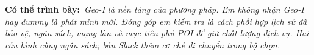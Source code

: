 \documentclass[10pt,a4paper]{article}
\newcommand{\say}[1]{\par\textbf{Có thể trình bày:}\ \textit{#1}\par}
\begin{document}
\clearpage

\say{Geo-I là nền tảng của phương pháp. Em không nhận Geo-I hay dummy là phát minh mới. Đóng góp em kiểm tra là cách phối hợp lịch sử đã bảo vệ, ngân sách, mạng làn và mục tiêu phủ POI để giữ chất lượng dịch vụ. Hai cấu hình cùng ngân sách; bản Slack thêm cơ chế di chuyển trong bộ chọn.}

\clearpage


\clearpage

\end{document}
